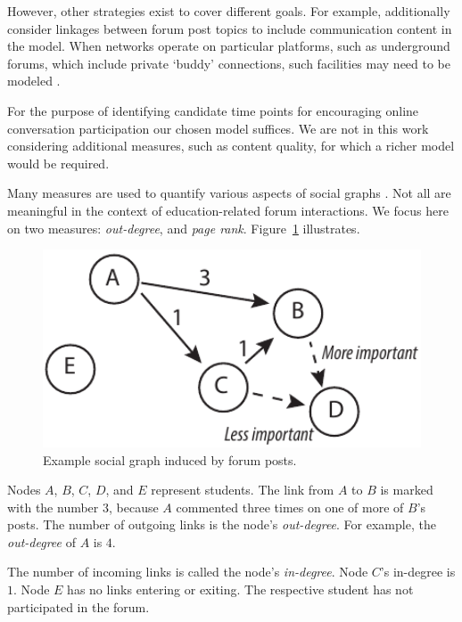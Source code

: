 However, other strategies exist to cover different goals. For example,
\cite{Anwar2013} additionally consider linkages between forum post
topics to include communication content in the model. When networks
operate on particular platforms, such as underground forums, which
include private `buddy' connections, such facilities may need to be
modeled \cite{Moto2011}.

For the purpose of identifying candidate time points for encouraging
online conversation participation our chosen model suffices. We are
not in this work considering additional measures, such as content
quality, for which a richer model would be required.

Many measures are used to quantify various aspects of social graphs
\cite{hann2005, lesk14}. Not all are meaningful in the context of
education-related forum interactions. We focus here on two measures:
{\em out-degree}, and {\em page rank}. Figure~\ref{fig:graphExpl}
illustrates.

\begin{figure}[htp]
       \centering
       \includegraphics[width=1.0\textwidth]{Figs/forumNetworkExample.pdf}
       \caption{\textnormal{Example social graph induced by forum posts.}}
       \label{fig:graphExpl}
\end{figure}

Nodes $A$, $B$, $C$, $D$, and $E$ represent students. The link from
$A$ to $B$ is marked with the number $3$, because $A$ commented three
times on one of more of $B$'s posts. The number of outgoing links is
the node's {\em out-degree}. For example, the {\em out-degree} of $A$
is $4$.

The number of incoming links is called the node's {\em
  in-degree}. Node $C$'s in-degree is $1$. Node $E$ has no links
entering or exiting. The respective student has not participated in
the forum.

